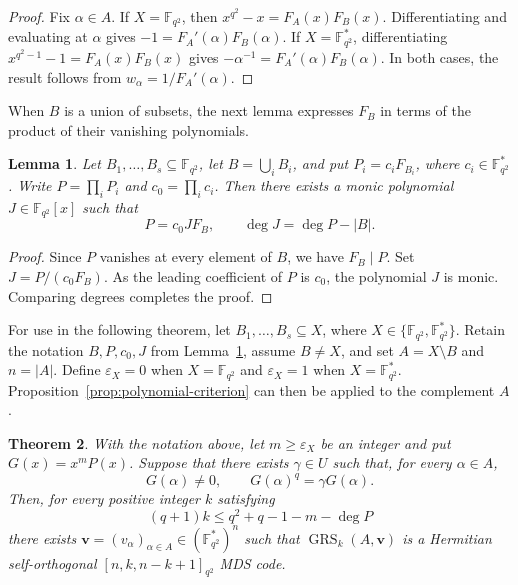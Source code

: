 \documentclass[preprint,12pt,a4paper]{elsarticle}
\newtheorem{theorem}{Theorem}[section]
\newtheorem{lemma}[theorem]{Lemma}
\newcommand{\GRS}{\operatorname{GRS}}
\begin{document}
\begin{proof}
Fix $\alpha\in A$. If $X=\mathbb F_{q^2}$, then $x^{q^2}-x=F_A(x)F_B(x)$. Differentiating and evaluating at $\alpha$ gives $-1=F_A'(\alpha)F_B(\alpha)$. If $X=\mathbb F_{q^2}^{*}$, differentiating $x^{q^2-1}-1=F_A(x)F_B(x)$ gives $-\alpha^{-1}=F_A'(\alpha)F_B(\alpha)$. In both cases, the result follows from $w_\alpha=1/F_A'(\alpha)$.
\end{proof}

When $B$ is a union of subsets, the next lemma expresses $F_B$ in terms of the product of their vanishing polynomials.

\begin{lemma}\label{lem:union-vanishing}
Let $B_1,\ldots,B_s\subseteq\mathbb F_{q^2}$, let $B=\bigcup_iB_i$, and put $P_i=c_iF_{B_i}$, where $c_i\in\mathbb F_{q^2}^{*}$. Write $P=\prod_iP_i$ and $c_0=\prod_ic_i$. Then there exists a monic polynomial $J\in\mathbb F_{q^2}[x]$ such that
\[
 P=c_0JF_B,
 \qquad \deg J=\deg P-|B|.
\]
\end{lemma}

\begin{proof}
Since $P$ vanishes at every element of $B$, we have $F_B\mid P$. Set $J=P/(c_0F_B)$. As the leading coefficient of $P$ is $c_0$, the polynomial $J$ is monic. Comparing degrees completes the proof.
\end{proof}

For use in the following theorem, let $B_1,\ldots,B_s\subseteq X$, where $X\in\{\mathbb F_{q^2},\mathbb F_{q^2}^{*}\}$. Retain the notation $B,P,c_0,J$ from Lemma~\ref{lem:union-vanishing}, assume $B\ne X$, and set $A=X\setminus B$ and $n=|A|$. Define $\varepsilon_X=0$ when $X=\mathbb F_{q^2}$ and $\varepsilon_X=1$ when $X=\mathbb F_{q^2}^{*}$. Proposition~\ref{prop:polynomial-criterion} can then be applied to the complement $A$.

\begin{theorem}\label{thm:general-construction}
With the notation above, let $m\ge\varepsilon_X$ be an integer and put $G(x)=x^mP(x)$. Suppose that there exists $\gamma\in U$ such that, for every $\alpha\in A$,
\begin{equation}\label{eq:general-frobenius}
 G(\alpha)\ne0,\qquad G(\alpha)^q=\gamma G(\alpha).
\end{equation}
Then, for every positive integer $k$ satisfying
\begin{equation}\label{eq:general-degree}
 (q+1)k\le q^2+q-1-m-\deg P
\end{equation}
there exists $\boldsymbol v=(v_\alpha)_{\alpha\in A}\in(\mathbb F_{q^2}^{*})^n$ such that $\GRS_k(A,\boldsymbol v)$ is a Hermitian self-orthogonal \mbox{$[n,k,n-k+1]_{q^2}$} MDS code.
\end{theorem}
\end{document}
